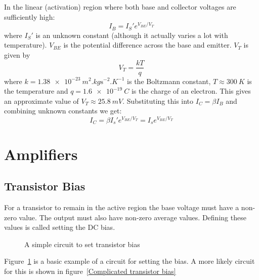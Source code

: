 \documentclass{article}
\begin{document}
    In the linear (activation) region where both base and collector voltages are sufficiently high:
    \[I_B=I_S'e^{V_{BE}/V_T}\]
    where \(I_S'\) is an unknown constant (although it actually varies a lot with temperature). \(V_{BE}\) is the potential difference across the base and emitter. \(V_T\) is given by
    \[V_T=\frac{kT}{q}\]
    where \(k = \num{1.38e-23}~\si{m^2.kg\s^{-2}.K^{-1}}\) is the Boltzmann constant, \(T\approx \SI{300}{K}\) is the temperature and \(q = \num{1.6e-19}~\si{C}\) is the charge of an electron. This gives an approximate value of \(V_T\approx \SI{25.8}{mV}\).
    Substituting this into \(I_C=\beta I_B\) and combining unknown constants we get:
    \[I_C=\beta I_s'e^{V_{BE}/V_T}=I_se^{V_{BE}/V_T}\]
    
    \section{Amplifiers}
    \subsection{Transistor Bias}
    For a transistor to remain in the active region the base voltage must have a non-zero value.
    The output must also have non-zero average values. Defining these values is called setting the DC bias.
    
    \begin{figure}[ht]
        \centering
        \caption{A simple circuit to set transistor bias}
        \label{Simple transistor bias}
    \end{figure}
    Figure~\ref{Simple transistor bias} is a basic example of a circuit for setting the bias. 
    A more likely circuit for this is shown in figure~\ref{Complicated transistor bias}
    
\end{document}
